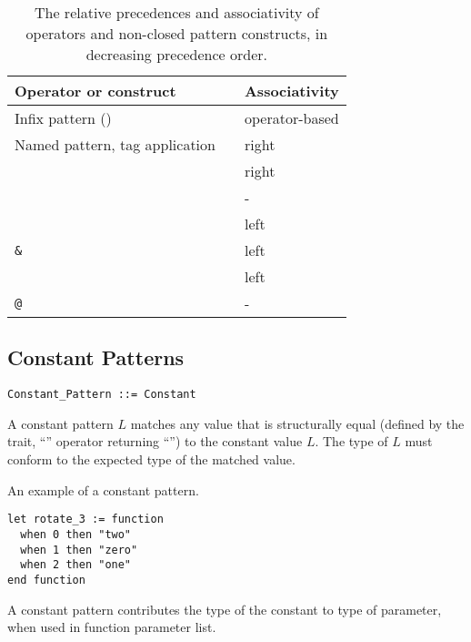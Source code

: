 \begin{table}[h!]
  \caption{The relative precedences and associativity of operators and non-closed pattern constructs, in decreasing precedence order.}
\begin{center}
\begin{tabular}{l l}
  Operator or construct & Associativity \\ \hline \hline
  Infix pattern () & operator-based \\ \hline
  Named pattern, tag application\ \  & right \\ \hline
  \code{::} & right \\ \hline
  \code{=>} & - \\ \hline
  \code{,} & left \\ \hline
  \lstinline!&! & left \\ \hline
  \code{|} & left \\ \hline
  \lstinline!@! & - \\ \hline
\end{tabular}
\end{center}
\label{table:pattern-matching-op-precedences}
\end{table}%





\subsection{Constant Patterns}
\label{sec:constant-patterns}

\syntax\begin{lstlisting}
Constant_Pattern ::= Constant
\end{lstlisting}

A constant pattern $L$ matches any value that is structurally equal (defined by the  trait, ``\code{=}'' operator returning ``'') to the constant value $L$. The type of $L$ must conform to the expected type of the matched value. 

\example An example of a constant pattern. 
\begin{lstlisting}
let rotate_3 := function
  when 0 then "two"
  when 1 then "zero"
  when 2 then "one"
end function
\end{lstlisting}

A constant pattern contributes the type of the constant to type of parameter, when used in function parameter list. 






